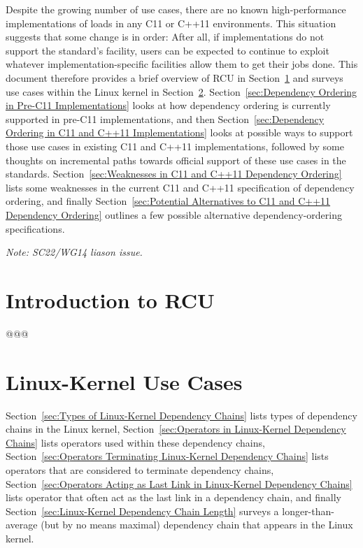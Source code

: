 \documentclass[letterpaper,twocolumn,10pt]{article}
\begin{document}
Despite the growing number of  use cases,
there are no known high-performance implementations of
 loads in any C11 or C++11 environments.
This situation suggests that some change is in order:  After all, if
implementations do not support the standard's 
facility, users
can be expected to continue to exploit whatever implementation-specific
facilities allow them to get their jobs done.
This document therefore provides a brief overview of RCU in
Section~\ref{sec:Introduction to RCU}
and surveys  use cases
within the Linux kernel in
Section~\ref{sec:Linux-Kernel Use Cases}.
Section~\ref{sec:Dependency Ordering in Pre-C11 Implementations}
looks at how dependency ordering is currently supported in
pre-C11 implementations,
and then
Section~\ref{sec:Dependency Ordering in C11 and C++11 Implementations}
looks at possible ways to
support those use cases in existing C11 and C++11 implementations,
followed by some thoughts on incremental paths towards official support
of these use cases in the standards.
Section~\ref{sec:Weaknesses in C11 and C++11 Dependency Ordering}
lists some weaknesses in the current C11 and C++11 specification
of dependency ordering, and finally
Section~\ref{sec:Potential Alternatives to C11 and C++11 Dependency Ordering}
outlines a few possible alternative dependency-ordering specifications.

\emph{Note: SC22/WG14 liason issue.}

\section{Introduction to RCU}
\label{sec:Introduction to RCU}

@@@

\section{Linux-Kernel Use Cases}
\label{sec:Linux-Kernel Use Cases}

Section~\ref{sec:Types of Linux-Kernel Dependency Chains}
lists types of dependency chains in the Linux kernel,
Section~\ref{sec:Operators in Linux-Kernel Dependency Chains}
lists operators used within these dependency chains,
Section~\ref{sec:Operators Terminating Linux-Kernel Dependency Chains}
lists operators that are considered to terminate dependency chains,
Section~\ref{sec:Operators Acting as Last Link in Linux-Kernel Dependency Chains}
lists operator that often act as the last link in a dependency chain,
and finally
Section~\ref{sec:Linux-Kernel Dependency Chain Length}
surveys a longer-than-average (but by no means maximal) dependency chain
that appears in the Linux kernel.
\end{document}
